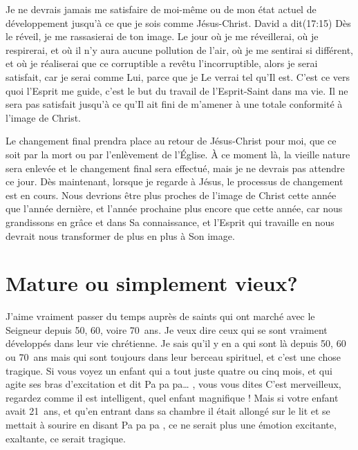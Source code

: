 Je ne devrais jamais me satisfaire de moi-même ou de mon état actuel
 de développement jusqu'à ce que je sois comme Jésus-Christ.
 David a dit\frcolon{}(17:15)
 \Og Dès le réveil, je me rassasierai de ton image. \Fg{}
 Le jour où je me réveillerai, où je respirerai,
 et où il n'y aura aucune pollution de l'air, où je me sentirai si différent,
 et où je réaliserai que ce corruptible a revêtu l'incorruptible,
 alors je serai satisfait, car je serai comme Lui, parce que je Le verrai
 tel qu'Il est. C'est ce vers quoi l'Esprit me guide,
 c'est le but du travail de l'Esprit-Saint dans ma vie.
 Il ne sera pas satisfait jusqu'à ce qu'Il ait fini de m'amener
 à une totale conformité à l'image de Christ.

Le changement final prendra place au retour de Jésus-Christ pour moi,
 que ce soit par la mort ou par l'enlèvement de l'Église.
 À ce moment là, la vieille nature sera enlevée et le changement final
 sera effectué, mais je ne devrais pas attendre ce jour.
 Dès maintenant, lorsque je regarde à Jésus, le processus de changement
 est en cours. Nous devrions être plus proches de l'image de Christ
 cette année que l'année dernière, et l'année prochaine plus encore
 que cette année, car nous grandissons en grâce et dans Sa connaissance,
 et l'Esprit qui travaille en nous devrait nous transformer
 de plus en plus à Son image.


\section{Mature ou simplement vieux?}

J'aime vraiment passer du temps auprès de saints
 qui ont marché avec le Seigneur depuis 50, 60, voire 70~ans.
 Je veux dire ceux qui se sont vraiment développés dans leur vie chrétienne.
 Je sais qu'il y en a qui sont là depuis 50, 60 ou 70~ans mais qui sont
 toujours dans leur berceau spirituel, et c'est une chose tragique.
 Si vous voyez un enfant qui a tout juste quatre ou cinq mois,
 et qui agite ses bras d'excitation et dit\frcolon{}
 \Og Pa pa pa\dots{} \Fg{}, vous vous dites\frcolon{}
 \Og C'est merveilleux, regardez comme il est intelligent,
 quel enfant magnifique ! \Fg{}
 Mais si votre enfant avait 21~ans, et qu'en entrant dans sa chambre
 il était allongé sur le lit et se mettait à sourire en disant\frcolon{}
 \Og Pa pa pa \Fg{}, ce ne serait plus une émotion excitante, exaltante,
 ce serait tragique.

